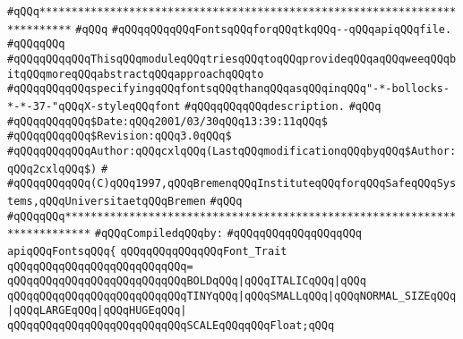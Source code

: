 \label{src/lib/tk/src/fonts.api}
\verb|#qQQq***************************************************************************|\newline
\verb|#qQQq|\newline
\verb|#qQQqqQQqqQQqFontsqQQqforqQQqtkqQQq--qQQqapiqQQqfile.|\newline
\verb|#qQQqqQQq|\newline
\verb|#qQQqqQQqqQQqThisqQQqmoduleqQQqtriesqQQqtoqQQqprovideqQQqaqQQqweeqQQqbitqQQqmoreqQQqabstractqQQqapproachqQQqto|\newline
\verb|#qQQqqQQqqQQqspecifyingqQQqfontsqQQqthanqQQqasqQQqinqQQq"-*-bollocks-*-*-37-"qQQqX-styleqQQqfont|\newline
\verb|#qQQqqQQqqQQqdescription.|\newline
\verb|#qQQq|\newline
\verb|#qQQqqQQqqQQq$Date:qQQq2001/03/30qQQq13:39:11qQQq$|\newline
\verb|#qQQqqQQqqQQq$Revision:qQQq3.0qQQq$|\newline
\verb|#qQQqqQQqqQQqAuthor:qQQqcxlqQQq(LastqQQqmodificationqQQqbyqQQq$Author:qQQq2cxlqQQq$)|\newline
\verb|#|\newline
\verb|#qQQqqQQqqQQq(C)qQQq1997,qQQqBremenqQQqInstituteqQQqforqQQqSafeqQQqSystems,qQQqUniversitaetqQQqBremen|\newline
\verb|#qQQq|\newline
\verb|#qQQqqQQq**************************************************************************|\newline
\newline
\verb|#qQQqCompiledqQQqby:|\newline
\verb|#qQQqqQQqqQQqqQQqqQQq|\newline
\newline
\verb|apiqQQqFontsqQQq{|\newline
\newline
\verb|qQQqqQQqqQQqqQQqFont_Trait|\newline
\verb|qQQqqQQqqQQqqQQqqQQqqQQqqQQq=|\newline
\verb|qQQqqQQqqQQqqQQqqQQqqQQqqQQqBOLDqQQq|\verb#|qQQqITALICqQQq|qQQq#\newline
\verb|qQQqqQQqqQQqqQQqqQQqqQQqqQQqTINYqQQq|\verb#|qQQqSMALLqQQq|qQQqNORMAL_SIZEqQQq|qQQqLARGEqQQq|qQQqHUGEqQQq|#\newline
\verb|qQQqqQQqqQQqqQQqqQQqqQQqqQQqSCALEqQQqqQQqFloat;qQQq|\newline
